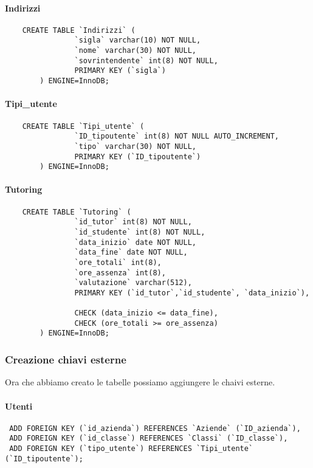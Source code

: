 \documentclass[12pt]{article}
\begin{document}
\paragraph{Indirizzi}
\begin{verbatim}
    CREATE TABLE `Indirizzi` (
        		`sigla` varchar(10) NOT NULL,
        		`nome` varchar(30) NOT NULL,
        		`sovrintendente` int(8) NOT NULL,
        		PRIMARY KEY (`sigla`)
	    ) ENGINE=InnoDB;    
\end{verbatim}

\paragraph{Tipi\_utente}
\begin{verbatim}
    CREATE TABLE `Tipi_utente` (
        		`ID_tipoutente` int(8) NOT NULL AUTO_INCREMENT,
        		`tipo` varchar(30) NOT NULL,
        		PRIMARY KEY (`ID_tipoutente`)
	    ) ENGINE=InnoDB;
\end{verbatim}

\newpage
\paragraph{Tutoring}
\begin{verbatim}
    CREATE TABLE `Tutoring` (
        		`id_tutor` int(8) NOT NULL,
        		`id_studente` int(8) NOT NULL,
        		`data_inizio` date NOT NULL,
        		`data_fine` date NOT NULL,
        		`ore_totali` int(8),
        		`ore_assenza` int(8),
        		`valutazione` varchar(512),
        		PRIMARY KEY (`id_tutor`,`id_studente`, `data_inizio`),
        		
        		CHECK (data_inizio <= data_fine),
        		CHECK (ore_totali >= ore_assenza)
    	) ENGINE=InnoDB;
\end{verbatim}
\subsubsection{Creazione chiavi esterne}
Ora che abbiamo creato le tabelle possiamo aggiungere le chaivi esterne.
\paragraph{Utenti}
\begin{verbatim}
 ADD FOREIGN KEY (`id_azienda`) REFERENCES `Aziende` (`ID_azienda`),
 ADD FOREIGN KEY (`id_classe`) REFERENCES `Classi` (`ID_classe`),
 ADD FOREIGN KEY (`tipo_utente`) REFERENCES `Tipi_utente` (`ID_tipoutente`);
\end{verbatim}
\end{document}
